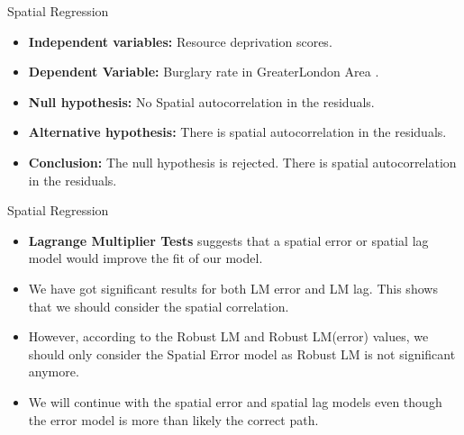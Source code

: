 \documentclass[10pt, aspectratio=169]{beamer}
\begin{document}
\begin{frame}{Spatial Regression}

    \small\begin{table}[!h]
        
        \caption{\label{tab:ols_summary} Estimation results of regression.}
    \end{table}
    \begin{itemize}
        \item \textbf{Independent variables:} Resource deprivation scores.
        \item \textbf{Dependent Variable:} Burglary rate in GreaterLondon Area .
        \item \textbf{Null hypothesis:} No Spatial autocorrelation in the residuals.
        \item \textbf{Alternative hypothesis:} There is spatial autocorrelation in the residuals.
        \item \textbf{Conclusion:} The null hypothesis is rejected. There is spatial autocorrelation in the residuals.
    \end{itemize}
\end{frame}

\begin{frame}{Spatial Regression}

    \begin{adjustbox}{max width=\textwidth, keepaspectratio, rotate=0, caption={Spatial Diagnostic Tests}, float=table}
        
    \end{adjustbox}\label{tab:spat_diag}

    \begin{itemize}
        \item \textbf{Lagrange Multiplier Tests} suggests that a spatial error or spatial lag model would improve the fit of our model.
        \item We have got significant results for both LM error and LM lag. This shows that we should consider the spatial correlation.
        \item However, according to the Robust LM and Robust LM(error) values, we should only consider the Spatial Error model as Robust LM is not significant anymore.
        \item We will continue with the spatial error and spatial lag models even though the error model is more than likely the correct path.
    \end{itemize}

\end{frame}
\end{document}
